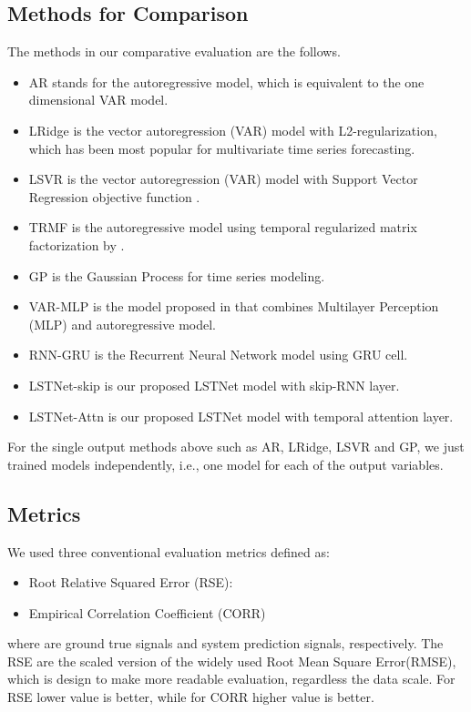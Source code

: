 \documentclass[sigconf]{acmart}
\def\VARMLP{{\sf VAR-MLP}\xspace}
\def\LRidge{{\sf LRidge}\xspace}
\def\LSVR{{\sf LSVR}\xspace}
\def\GP{{\sf GP}\xspace}
\def\TRMF{{\sf TRMF}\xspace}
\def\AR{{\sf AR}\xspace}
\begin{document}
\subsection{Methods for Comparison}
\label{sec:baseline}
The methods in our comparative evaluation are the follows.
\begin{itemize}
    \item \AR stands for the autoregressive model, which is equivalent to the one dimensional VAR model. 
    \item \LRidge is the vector autoregression (VAR) model with L2-regularization, which has been most popular for multivariate time series forecasting.
    \item \LSVR is the vector autoregression (VAR) model with Support Vector Regression objective function \cite{vapnik1997support} . 
    \item \TRMF is the autoregressive model using temporal regularized matrix factorization by \cite{Yu_NIPS_16}.
    \item \GP is the Gaussian Process for time series modeling. \cite{frigola2015bayesian,roberts2013gaussian}
\item \VARMLP is the model proposed in \cite{zhang2003time} that combines Multilayer Perception (MLP) and autoregressive model. 
    \item RNN-GRU is the Recurrent Neural Network model using GRU cell. 
    \item LSTNet-skip is our proposed LSTNet model with skip-RNN layer. 
    \item LSTNet-Attn is our proposed LSTNet model with temporal attention layer.
\end{itemize}
For the single output methods above such as \AR, \LRidge, \LSVR and \GP, we just trained  models independently, i.e., one model for each of the  output variables.

\subsection{Metrics}
\label{sec:metrics} 
We used three conventional evaluation metrics defined as:
\begin{itemize}
	\item Root Relative Squared Error (RSE):
        
    \item Empirical Correlation Coefficient (CORR)
            
\end{itemize}
where  are ground true signals and system prediction signals, respectively. 
The RSE are the scaled version of the widely used Root Mean Square Error(RMSE), which is design to make more readable evaluation, regardless the data scale. 
For RSE lower value is better, while for CORR higher value is better.
\end{document}
